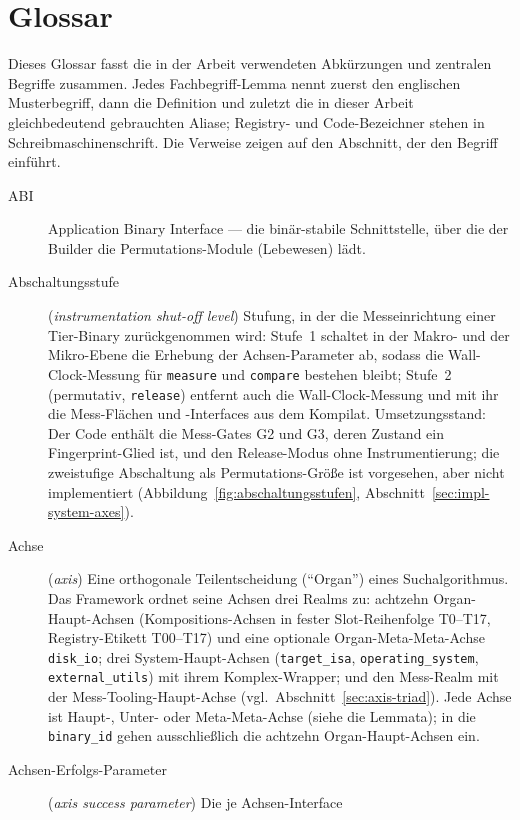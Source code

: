 \chapter{Glossar}\label{app:glossary}

Dieses Glossar fasst die in der Arbeit verwendeten Abkürzungen und zentralen Begriffe zusammen. Jedes
Fachbegriff-Lemma nennt zuerst den englischen Musterbegriff, dann die Definition und zuletzt die in
dieser Arbeit gleichbedeutend gebrauchten Aliase; Registry- und Code-Bezeichner stehen in
Schreibmaschinenschrift. Die Verweise zeigen auf den Abschnitt, der den Begriff einführt.

\begin{description}
  \item[ABI] Application Binary Interface --- die binär-stabile Schnittstelle, über die der Builder
  die Permutations-Module (Lebewesen) lädt.
  \item[Abschaltungsstufe] (\emph{instrumentation shut-off level}) Stufung, in der die
  Messeinrichtung einer Tier-Binary zurückgenommen wird: Stufe~1 schaltet in der Makro- und der
  Mikro-Ebene die Erhebung der Achsen-Parameter ab, sodass die Wall-Clock-Messung für
  \texttt{measure} und \texttt{compare} bestehen bleibt; Stufe~2 (permutativ, \texttt{release})
  entfernt auch die Wall-Clock-Messung und mit ihr die Mess-Flächen und -Interfaces aus dem
  Kompilat. Umsetzungsstand: Der Code enthält die Mess-Gates G2 und G3, deren Zustand ein
  Fingerprint-Glied ist, und den Release-Modus ohne Instrumentierung; die zweistufige Abschaltung
  als Permutations-Größe ist vorgesehen, aber nicht implementiert (Abbildung~\ref{fig:abschaltungsstufen},
  Abschnitt~\ref{sec:impl-system-axes}).
  \item[Achse] (\emph{axis}) Eine orthogonale Teilentscheidung (\enquote{Organ}) eines
  Suchalgorithmus. Das Framework ordnet seine Achsen drei Realms zu: achtzehn Organ-Haupt-Achsen
  (Kompositions-Achsen in fester Slot-Reihenfolge T0--T17, Registry-Etikett T00--T17) und eine
  optionale Organ-Meta-Meta-Achse \texttt{disk\_io}; drei System-Haupt-Achsen
  (\texttt{target\_isa}, \texttt{operating\_system}, \texttt{external\_utils}) mit ihrem
  Komplex-Wrapper; und den Mess-Realm mit der Mess-Tooling-Haupt-Achse
  (vgl.\ Abschnitt~\ref{sec:axis-triad}). Jede Achse ist Haupt-, Unter- oder Meta-Meta-Achse (siehe
  die Lemmata); in die \texttt{binary\_id} gehen ausschließlich die achtzehn Organ-Haupt-Achsen ein.
  \item[Achsen-Erfolgs-Parameter] (\emph{axis success parameter}) Die je Achsen-Interface

\end{description}
